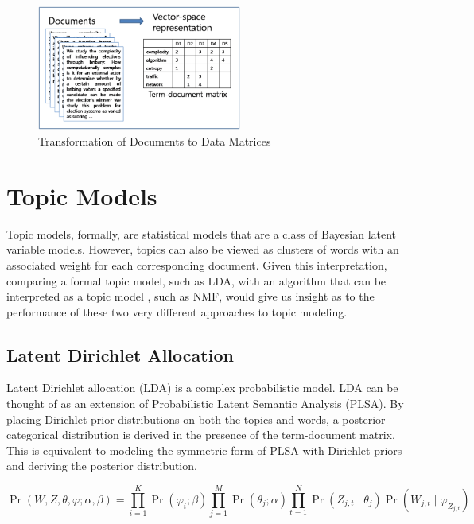 \documentclass[10pt]{article}
\begin{document}
\begin{figure}[H]
\centering
\includegraphics[width=0.6\textwidth, keepaspectratio]{nmf_cluster1-2}
\caption{Transformation of Documents to Data Matrices \cite{td-matrix-pic}}
\label{td-fig}
\end{figure}

\section{Topic Models}

    Topic models, formally, are statistical models that are a class of Bayesian latent variable models.  However, topics can also be viewed as clusters of words with an associated weight for each corresponding document.  Given this interpretation, comparing a formal topic model, such as LDA, with an algorithm that can be interpreted as a topic model \cite{plsa-nmf}, such as NMF, would give us insight as to the performance of these two very different approaches to topic modeling.
    
\subsection{Latent Dirichlet Allocation}

Latent Dirichlet allocation (LDA) \cite{lda} is a complex probabilistic model.  LDA can be thought of as an extension of Probabilistic Latent Semantic Analysis (PLSA).  By placing Dirichlet prior distributions on both the topics and words, a posterior categorical distribution is derived in the presence of the term-document matrix.  This is equivalent to modeling the symmetric form of PLSA with Dirichlet priors and deriving the posterior distribution.

\begin{equation}
\label{LDA}
\Pr(W,Z,\theta,\varphi;\alpha,\beta) = \prod\limits_{i=1}^{K} \Pr(\varphi_i;\beta) \prod\limits_{j=1}^{M} \Pr(\theta_j;\alpha) \prod\limits_{t=1}^{N} \Pr(Z_{j,t}\mid\theta_j)\Pr(W_{j,t}\mid\varphi_{Z_{j,t}})
\end{equation}
\end{document}
